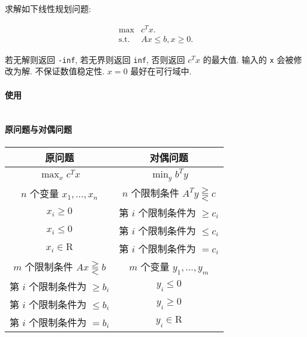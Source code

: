 求解如下线性规划问题:

\[
    \begin{array}{ll}
        \max          & c^T x.             \\
        \textrm{s.t.} & Ax \le b, x \ge 0.
    \end{array}
\]

若无解则返回 \verb|-inf|, 若无界则返回 \verb|inf|, 否则返回 \(c^T x\) 的最大值. 输入的 \verb|x| 会被修改为解. 不保证数值稳定性. \(x = 0\) 最好在可行域中.

\paragraph{使用}

\inputminted{cpp}{src/src/simplex_usage.txt}

\paragraph{原问题与对偶问题}

\begin{tabular}{|c|c|}
    \hline
    原问题                             & 对偶问题                               \\
    \hline
    \(\max_x c^T x\)                & \(\min_y b^T y\)                   \\
    \hline
    \(n\) 个变量 \(x_1,\dots,x_n\)     & \(n\) 个限制条件 \(A^T y\gtreqqless c\) \\
    \(x_i\geq 0\)                   & 第 \(i\) 个限制条件为 \(\geq c_i\)        \\
    \(x_i\leq 0\)                   & 第 \(i\) 个限制条件为 \(\leq c_i\)        \\
    \(x_i\in \mathrm{R}\)           & 第 \(i\) 个限制条件为 \(=c_i\)            \\
    \hline
    \(m\) 个限制条件 \(Ax\gtreqqless b\) & \(m\) 个变量 \(y_1,\dots,y_m\)        \\
    第 \(i\) 个限制条件为 \(\geq b_i\)     & \(y_i\leq 0\)                      \\
    第 \(i\) 个限制条件为 \(\leq b_i\)     & \(y_i\geq 0\)                      \\
    第 \(i\) 个限制条件为 \(=b_i\)         & \(y_i\in \mathrm{R}\)              \\
    \hline
\end{tabular}


